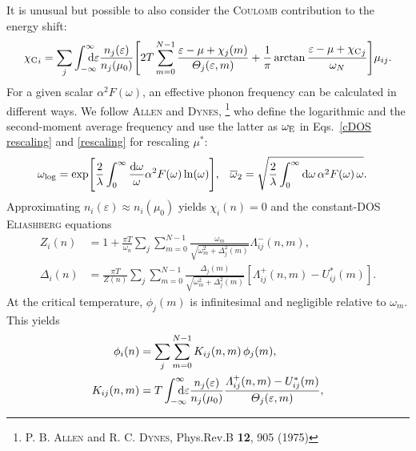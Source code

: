 \documentclass[a4paper]{article}
\def\D{\mathrm d}
\def\sub#1{\sb{\mathrm{#1}}}
\def\from#1{\sb{\mathrlap{#1}}}
\def\till#1{\sp{\mathrlap{#1}}}
\let\Delta\varDelta
\let\epsilon\varepsilon
\let\Lambda\varLambda
\let\Theta\varTheta
\begin{document}
   \endgroup
   It is unusual but possible to also consider the \textsc{Coulomb} contribution
   to the energy shift:
   \begin{equation*}
      {\chi \sub C}_i = \sum_j
      \int \from{-\infty} \till \infty \D \epsilon
      \frac{n_j(\epsilon)}{n_j(\mu_0)}
      \Biggl[
         2 T \sum_{m = 0}^{N - 1}
         \frac{\epsilon - \mu + \chi_j(m)}{\Theta_j(\epsilon, m)}
         + \frac 1 \pi \arctan \frac{\epsilon - \mu + {\chi \sub C}_j}{\omega_N}
      \Biggr]
      \mu_{i j}.
   \end{equation*}
   For a given scalar $\alpha^2 F(\omega)$, an effective phonon frequency can be
   calculated in different ways. We follow \textsc{Allen} and \textsc{Dynes},%
   \footnote{%
      P. B. \textsc{Allen} and R. C. \textsc{Dynes}, Phys.\@ Rev.\@ B
      \textbf{12}, 905 (1975)
      }
   who define the logarithmic and the second-moment average frequency and use
   the latter as $\omega \sub E$ in Eqs.~\ref{cDOS rescaling} and
   \ref{rescaling} for rescaling $\mu^*$:
   \begin{align*}
       \omega \sub{log} &= \exp
       \Biggl[
          \frac 2 \lambda \int_0^\infty
          \frac{\D \omega} \omega
          \alpha^2 F(\omega) \ln(\omega)
       \Biggr],
       &
       \overline \omega_2 &= \sqrt
       {
          \frac 2 \lambda \int_0^\infty
          \D \omega \,
          \alpha^2 F(\omega) \, \omega
       }.
   \end{align*}
   Approximating $n_i(\epsilon) \approx n_i(\mu_0)$ yields $\chi_i(n) = 0$ and
   the constant-DOS \textsc{Eliashberg} equations
   \begin{equation}
      \begin{split}
         Z_i(n) &= 1 + \frac{\pi T}{\omega_n} \sum_j \sum_{m = 0}^{N - 1}
         \frac{\omega_m}{\sqrt{\omega_m^2 + \Delta_j^2(m)}}
         \Lambda_{i j}^-(n, m),
         \\
         \Delta_i(n) &= \frac{\pi T}{Z(n)} \sum_j \sum_{m = 0}^{N - 1}
         \frac{\Delta_j(m)}{\sqrt{\omega_m^2 + \Delta_j^2(m)}}
         [\Lambda_{i j}^+(n, m) - U^*_{i j}(m)].
      \end{split}
      \label{cDOS Eliashberg equations}
   \end{equation}
   At the critical temperature, $\phi_j(m)$ is infinitesimal and negligible
   relative to $\omega_m$. This yields
   \begin{equation}
      \begin{split}
         \phi_i(n) &= \sum_j \sum_{m = 0}^{N - 1}
         K_{i j}(n, m) \, \phi_j(m),
         \\
         K_{i j}(n, m) &= T
         \int \from{-\infty} \till \infty \D \epsilon
         \frac{n_j(\epsilon)}{n_j(\mu_0)}
         \frac{\Lambda_{i j}^+(n, m) - U^*_{i j}(m)}{\Theta_j(\epsilon, m)},
      \end{split}
      \label{linearized equation}
   \end{equation}
\end{document}
